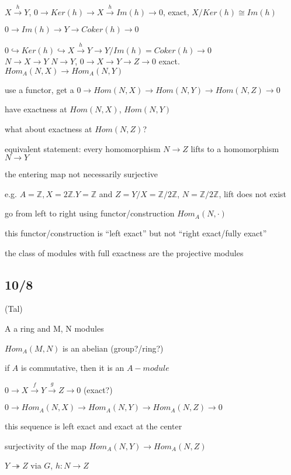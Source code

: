 \documentclass[12pt]{article}
\begin{document}
\noindent
$X \xrightarrow{h} Y$, $0 \to Ker(h) \to X \xrightarrow{h} Im(h) \to 0$, exact, $X/Ker(h) \cong Im(h)$

\noindent
$0 \to Im(h) \to Y \to Coker(h) \to 0$

\noindent
$0 \hookrightarrow Ker(h) \hookrightarrow X \xrightarrow{h} Y \to Y/Im(h) = Coker(h) \to 0$\\

\noindent
$N \to X \to Y$ $N \to Y$, $0 \to X \to Y \to Z \to 0$ exact.  $Hom_A(N, X) \to Hom_A(N, Y)$

use a functor, get a $0 \to Hom(N, X) \to Hom(N, Y) \to Hom(N, Z) \to 0$

have exactness at $Hom(N, X)$, $Hom(N, Y)$

what about exactness at $Hom(N, Z)$?

equivalent statement: every homomorphism $N \to Z$ lifts to a homomorphism $N \to Y$

the entering map not necessarily surjective

e.g. $A = \mathds{Z}, X = 2\mathds{Z}. Y = \mathds{Z}$ and $Z = Y/X = \mathds{Z}/2\mathds{Z}$, $N = \mathds{Z}/2\mathds{Z}$, lift does not exist

go from left to right using functor/construction $Hom_A(N, \cdot)$

this functor/construction is ``left exact'' but not ``right exact/fully exact''

the class of modules with full exactness are the projective modules

\subsection{10/8}

\noindent
(Tal)

\noindent
A a ring and M, N modules

$Hom_A(M, N)$ is an abelian (group?/ring?)

if $A$ is commutative, then it is an $A-module$

\noindent
$0 \to X \xrightarrow{f} Y \xrightarrow{g} Z \to 0$ (exact?)

$0 \to Hom_A(N, X) \to Hom_A(N, Y) \to Hom_A(N, Z) \to 0$ 

this sequence is left exact and exact at the center

\noindent
surjectivity of the map $Hom_A(N, Y) \to Hom_A(N, Z)$

$Y \twoheadrightarrow Z$ via $G$, $h: N \to Z$
\end{document}
